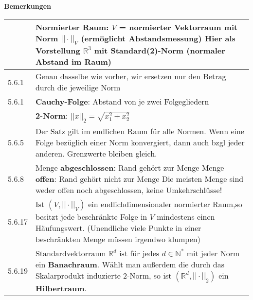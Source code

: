 \noindent
\textbf{Bemerkungen}
\begin{table}[H]
\begin{tabularx}{\textwidth}{X m{16cm}}
    \toprule

          & Normierter Raum: $V$ = normierter Vektorraum mit Norm $||\cdot||_V$ (ermöglicht Abstandsmessung) \hfill \break
            Hier als Vorstellung $\mathbb{R}^3$ mit Standard(2)-Norm (normaler Abstand im Raum) \\
    \midrule
    5.6.1 & Genau dasselbe wie vorher, wir ersetzen nur den Betrag durch die jeweilige Norm \\
    \midrule
    5.6.1 & \textbf{Cauchy-Folge}: Abstand von je zwei Folgegliedern \\
    \midrule
          & \textbf{2-Norm}: $||x||_2 = \sqrt{x_1^2 + x_2^2}$ \\
    \midrule
    5.6.5 & Der Satz gilt im endlichen Raum für alle Normen. \hfill \break
            Wenn eine Folge bezüglich einer Norm konvergiert, dann auch bzgl jeder anderen. \hfill \break 
            Grenzwerte bleiben gleich. \\
    \midrule
    5.6.8 & Menge \textbf{abgeschlossen}: Rand gehört zur Menge \hfill \break
            Menge \textbf{offen}: Rand gehört nicht zur Menge \hfill \break
            Die meisten Menge sind weder offen noch abgeschlossen, keine Umkehrschlüsse! \\
    \midrule
    5.6.17& Ist $(V,||\cdot||_V)$ ein endlichdimensionaler normierter Raum,so besitzt jede beschränkte Folge in 
            $V$ mindestens einen Häufungswert. (Unendliche viele Punkte in einer beschränkten Menge müssen irgendwo klumpen) \\
    \midrule
    5.6.19& Standardvektorraum $\mathbb{R}^d$ ist für jedes $d \in \mathbb{N^*}$ mit jeder Norm ein \textbf{Banachraum}. \hfill \break
            Wählt man au\ss erdem die durch das Skalarprodukt induzierte 2-Norm, so ist $(\mathbb{R}^d, ||\cdot||_2)$ ein \textbf{Hilbertraum}. \\

    \bottomrule
\end{tabularx}
\end{table}

\pagebreak

